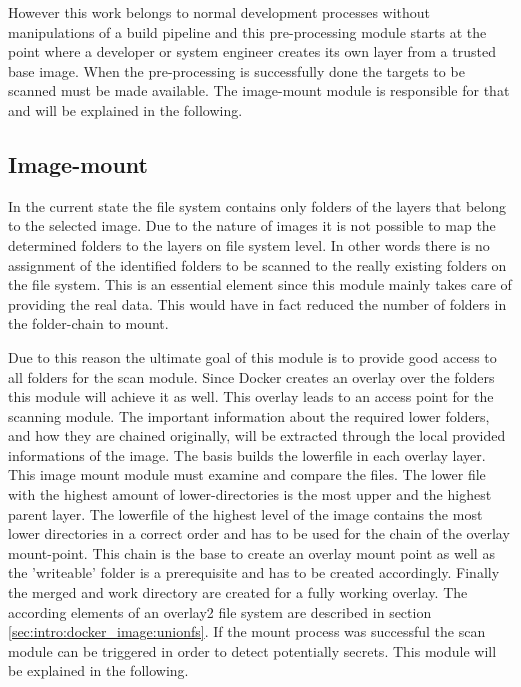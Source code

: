 However this work belongs to normal development processes without manipulations of a build pipeline and this pre-processing module starts at the point where a developer or system engineer creates its own layer from a trusted base image. When the pre-processing is successfully done the targets to be scanned must be made available. The image-mount module is responsible for that and will be explained in the following.

\subsection{Image-mount}
\label{ch:theory:analysing_process:imgmount}
In the current state the file system contains only folders of the layers that belong to the selected image.
Due to the nature of images it is not possible to map the determined folders to the layers on file system level. In other words there is no assignment of the identified folders to be scanned to the really existing folders on the file system.
This is an essential element since this module mainly takes care of providing the real data. This would have in fact reduced the number of folders in the folder-chain to mount. 

Due to this reason the ultimate goal of this module is to provide good access to all folders for the scan module. Since Docker creates an overlay over the folders this module will achieve it as well. This overlay leads to an access point for the scanning module. The important information about the required lower folders, and how they are chained originally, will be extracted through the local provided informations of the image. The basis builds the lowerfile in each overlay layer. This image mount module must examine and compare the files. The lower file with the highest amount of lower-directories is the most upper and the highest parent layer.
The lowerfile of the highest level of the image contains the most lower directories in a correct order and has to be used for the chain of the overlay mount-point.
This chain is the base to create an overlay mount point as well as the 'writeable' folder is a prerequisite and has to be created accordingly. Finally the merged and work directory are created for a fully working overlay. The according elements of an overlay2 file system are described in section \ref{sec:intro:docker_image:unionfs}. 
If the mount process was successful the scan module can be triggered in order to detect potentially secrets. This module will be explained in the following.

